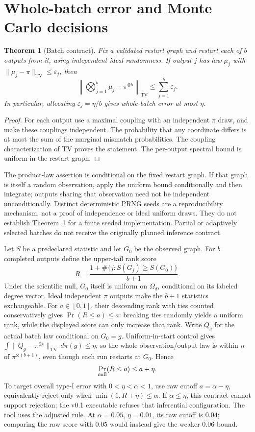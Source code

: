 \documentclass[11pt]{article}
\newtheorem{theorem}{Theorem}
\newcommand{\TV}{\mathrm{TV}}
\newcommand{\Om}{\Omega_d}
\begin{document}
\section{Whole-batch error and Monte Carlo decisions}
\begin{theorem}[Batch contract]\label{thm:batch}
Fix a validated restart graph and restart each of $b$ outputs from it, using independent ideal randomness. If output $j$ has law $\mu_j$ with $\|\mu_j-\pi\|_\TV\le\varepsilon_j$, then
\[
 \left\|\bigotimes_{j=1}^b\mu_j-\pi^{\otimes b}\right\|_\TV
 \le\sum_{j=1}^b\varepsilon_j.
\]
In particular, allocating $\varepsilon_j=\eta/b$ gives whole-batch error at most $\eta$.
\end{theorem}
\begin{proof}
For each output use a maximal coupling with an independent $\pi$ draw, and make these couplings independent. The probability that any coordinate differs is at most the sum of the marginal mismatch probabilities. The coupling characterization of TV proves the statement. The per-output spectral bound is uniform in the restart graph.
\end{proof}

The product-law assertion is conditional on the fixed restart graph. If that graph is itself a random observation, apply the uniform bound conditionally and then integrate; outputs sharing that observation need not be independent unconditionally. Distinct deterministic PRNG seeds are a reproducibility mechanism, not a proof of independence or ideal uniform draws. They do not establish Theorem~\ref{thm:batch} for a finite seeded implementation. Partial or adaptively selected batches do not receive the originally planned inference contract.

Let $S$ be a predeclared statistic and let $G_0$ be the observed graph. For $b$ completed outputs define the upper-tail rank score
\begin{equation}\label{eq:rank}
 R=\frac{1+\#\{j:S(G_j)\ge S(G_0)\}}{b+1}.
\end{equation}
Under the scientific null, $G_0$ itself is uniform on $\Om$, conditional on its labeled degree vector. Ideal independent $\pi$ outputs make the $b+1$ statistics exchangeable. For $a\in[0,1]$, their descending rank with ties counted conservatively gives $\Pr(R\le a)\le a$: breaking ties randomly yields a uniform rank, while the displayed score can only increase that rank. Write $Q_g$ for the actual batch law conditional on $G_0=g$. Uniform-in-start control gives $\int\|Q_g-\pi^{\otimes b}\|_\TV\,d\pi(g)\le\eta$, so the whole observation/output law is within $\eta$ of $\pi^{\otimes(b+1)}$, even though each run restarts at $G_0$. Hence
\begin{equation}\label{eq:typeI}
 \Pr_{\rm null}(R\le a)\le a+\eta.
\end{equation}
To target overall type-I error with $0<\eta<\alpha<1$, use raw cutoff $a=\alpha-\eta$, equivalently reject only when $\min(1,R+\eta)\le\alpha$. If $\alpha\le\eta$, this contract cannot support rejection; the v0.1 executable refuses that inferential configuration. The tool uses the adjusted rule. At $\alpha=0.05$, $\eta=0.01$, its raw cutoff is $0.04$; comparing the raw score with $0.05$ would instead give the weaker $0.06$ bound.
\end{document}

